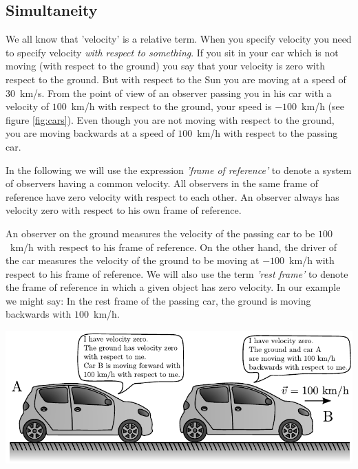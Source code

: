 {\begin{multicols}{2}

\section{Simultaneity}
\label{sect:simul}

We all know that 'velocity' is a relative term. When you specify velocity you need to specify velocity \emph{with respect to something}. If you sit in your car which is not moving (with respect to the ground) you say that your velocity is zero with respect to the ground. But with respect to the Sun you are moving at a speed of $30$~km/s. From the point of view of an observer passing you in his car with a velocity of $100$~km/h with respect to the ground, your speed is $-100$~km/h (see figure \ref{fig:cars}). Even though you are not moving with respect to the ground, you are moving backwards at a speed of $100$~km/h with respect to the passing car. 

In the following we will use the expression \emph{'frame of reference'} to denote a system of observers having a common velocity. All observers in the same frame of reference have zero velocity with respect to each other. An observer always has velocity zero with respect to his own frame of reference. 

An observer on the ground measures the velocity of the passing car to be $100$~km/h with respect to his frame of reference. On the other hand, the driver of the car measures the velocity of the ground to be moving at $-100$~km/h with respect to his frame of reference. 
We will also use the term \emph{'rest frame'} to denote the frame of reference in which a given object has zero velocity. In our example we might say: In the rest frame of the passing car, the ground is moving backwards with $100$~km/h.

\begin{Figure}%
\centering
\includegraphics[width=\textwidth]{fig_7-1.pdf}
\end{Figure}


\end{multicols}}
